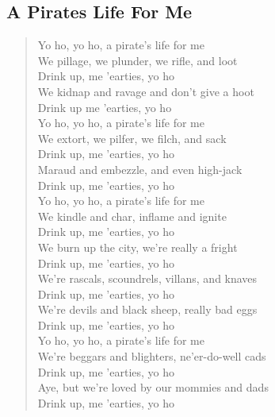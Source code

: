 \documentclass[11pt]{article}
\begin{document}
\subsection{A Pirates Life For Me}
\label{sec:orgb2f6446}
\begin{verse}
Yo ho, yo ho, a pirate's life for me\\
We pillage, we plunder, we rifle, and loot\\
Drink up, me 'earties, yo ho\\
We kidnap and ravage and don't give a hoot\\
Drink up me 'earties, yo ho\\
\vspace*{1em}
Yo ho, yo ho, a pirate's life for me\\
We extort, we pilfer, we filch, and sack\\
Drink up, me 'earties, yo ho\\
Maraud and embezzle, and even high-jack\\
Drink up, me 'earties, yo ho\\
\vspace*{1em}
Yo ho, yo ho, a pirate's life for me\\
We kindle and char, inflame and ignite\\
Drink up, me 'earties, yo ho\\
We burn up the city, we're really a fright\\
Drink up, me 'earties, yo ho\\
\vspace*{1em}
We're rascals, scoundrels, villans, and knaves\\
Drink up, me 'earties, yo ho\\
We're devils and black sheep, really bad eggs\\
Drink up, me 'earties, yo ho\\
\vspace*{1em}
Yo ho, yo ho, a pirate's life for me\\
We're beggars and blighters, ne'er-do-well cads\\
Drink up, me 'earties, yo ho\\
Aye, but we're loved by our mommies and dads\\
Drink up, me 'earties, yo ho\\
\end{verse}
\clearpage
\end{document}
